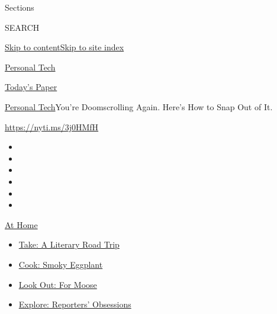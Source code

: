 Sections

SEARCH

\protect\hyperlink{site-content}{Skip to
content}\protect\hyperlink{site-index}{Skip to site index}

\href{https://www.nytimes3xbfgragh.onion/section/technology/personaltech}{Personal
Tech}

\href{https://myaccount.nytimes3xbfgragh.onion/auth/login?response_type=cookie\&client_id=vi}{}

\href{https://www.nytimes3xbfgragh.onion/section/todayspaper}{Today's
Paper}

\href{/section/technology/personaltech}{Personal Tech}\textbar{}You're
Doomscrolling Again. Here's How to Snap Out of It.

\href{https://nyti.ms/3j0HMfH}{https://nyti.ms/3j0HMfH}

\begin{itemize}
\item
\item
\item
\item
\item
\item
\end{itemize}

\href{https://www.nytimes3xbfgragh.onion/spotlight/at-home?action=click\&pgtype=Article\&state=default\&region=TOP_BANNER\&context=at_home_menu}{At
Home}

\begin{itemize}
\tightlist
\item
  \href{https://www.nytimes3xbfgragh.onion/2020/07/28/books/time-for-a-literary-road-trip.html?action=click\&pgtype=Article\&state=default\&region=TOP_BANNER\&context=at_home_menu}{Take:
  A Literary Road Trip}
\item
  \href{https://www.nytimes3xbfgragh.onion/2020/07/29/magazine/bored-with-your-home-cooking-some-smoky-eggplant-will-fix-that.html?action=click\&pgtype=Article\&state=default\&region=TOP_BANNER\&context=at_home_menu}{Cook:
  Smoky Eggplant}
\item
  \href{https://www.nytimes3xbfgragh.onion/2020/07/27/travel/moose-michigan-isle-royale.html?action=click\&pgtype=Article\&state=default\&region=TOP_BANNER\&context=at_home_menu}{Look
  Out: For Moose}
\item
  \href{https://www.nytimes3xbfgragh.onion/interactive/2020/at-home/even-more-reporters-editors-diaries-lists-recommendations.html?action=click\&pgtype=Article\&state=default\&region=TOP_BANNER\&context=at_home_menu}{Explore:
  Reporters' Obsessions}
\end{itemize}

